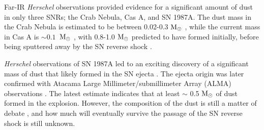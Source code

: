 \documentclass{emulateapj}
\newcommand{\spitzer}{\textit{Spitzer }}
\newcommand{\herschel}{\textit{Herschel }}
\begin{document}
\begin{figure*}
   
\caption{\label{3color}\textbf{Left:} A three color composite image of G54.1+0.3 with the \spitzer 8.0 and 24 \micron\ images in green and red, and the \textit{Chandra} X-ray 0.3-10 keV image in blue (NASA/CXC/SAO/\citet{temim10}). The PWN seen in X-rays is surrounded by an IR shell with a radius of 1 that emits strongly at 24 \micron. A dozen point sources emitting at both 8 and 24 \micron\ are seen in yellow. The white boxes represent the positions of the high-resolution \spitzer IRS  slits \citep{temim10}, with their corresponding line-subtracted spectra shown in Figure \ref{irsspec}. \textbf{Middle:} A two color image showing the 4.8 Ghz VLA radio synchrotron emission from the PWN in red and \herschel PACS 100 \micron\ infrared emission in cyan. The location of the pulsar is marked by the white plus symbol. \textbf{Right:} \textit{Herschel} SPIRE 250 \micron\ image of the IR shell in red and PACS 70 \micron\ image in teal, convolved to match the 250 \micron\ resolution. The overlay clearly shows the different morphologies of the 70 and 250 \micron\ emission.}
\end{figure*}


Far-IR \herschel observations provided evidence for a significant amount of dust in only three SNRs; the Crab Nebula, Cas A, and SN 1987A. The dust mass in the Crab Nebula is estimated to be between 0.02-0.3 $\rm M_{\odot}$ \citep{gomez12a, temim13, owen15}, while the current mass in Cas A is $\sim0.1$~$\rm M_{\odot}$ \citep{barlow10,sibthorpe10,arendt14}, with 0.8-1.0 $\rm M_{\odot}$ predicted to have formed initially, before being sputtered away by the SN reverse shock \citep{micelotta16}. 

\herschel observations of SN 1987A led to an exciting discovery of a significant mass of dust that likely formed in the SN ejecta \citep{matsuura11}. The ejecta origin was later confirmed with Atacama Large Millimeter/submillimeter Array (ALMA) observations \citep{indebetouw14}. The latest estimate indicates that at least $\sim$ 0.5 $\rm M_{\odot}$ of dust formed in the explosion. However, the composition of the dust is still a matter of debate \citep{matsuura15,dwek15,wesson15}, and how much will eventually survive the passage of the SN reverse shock is still unknown.
\end{document}
